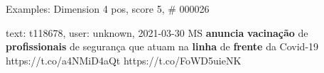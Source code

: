 \begin{frame}{Examples: Dimension 4 pos, score 5, \# 000026}
\footnotesize
\begin{exampleblock}{text: t118678, user: unknown, 2021-03-30}
MS \textbf{anuncia} \textbf{vacinação} de \textbf{profissionais} de segurança 
que atuam na \textbf{linha} de \textbf{frente} da Covid-19 
https://t.co/a4NMiD4aQt https://t.co/FoWD5uieNK 
\end{exampleblock}
\end{frame}
